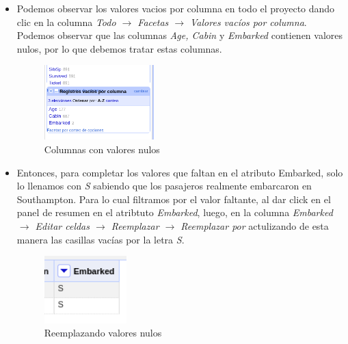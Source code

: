 \documentclass[12pt]{article}
\begin{document}
\begin{itemize}
                    \item Podemos observar los valores vacios por columna en todo el proyecto dando clic en la columna \textit{Todo $\rightarrow$ Facetas $\rightarrow$ Valores vacíos por columna}. Podemos observar que las columnas \textit{Age, Cabin} y \textit{Embarked} contienen valores nulos, por lo que debemos tratar estas columnas.
                        \newpage
                        \begin{figure}[!h]
                            \centering
                            \includegraphics[width=0.4\textwidth]{img/openrefine-13.png}
                            \caption{Columnas con valores nulos}
                        \end{figure}
                    
                    \item Entonces, para completar los valores que faltan en el atributo Embarked, solo lo llenamos con \textit{S} sabiendo que los pasajeros realmente embarcaron en Southampton. Para lo cual filtramos por el valor faltante, al dar click en el panel de resumen en el atribtuto \textit{Embarked}, luego, en la columna \textit{Embarked $\rightarrow$ Editar celdas $\rightarrow$ Reemplazar $\rightarrow$ Reemplazar por} actulizando de esta manera las casillas vacías por la letra \textit{S}.
                        \begin{figure}[!h]
                            \centering
                            \includegraphics[width=0.3\textwidth]{img/openrefine-14.png}
                            \caption{Reemplazando valores nulos}
                        \end{figure}
                    

\end{itemize}
\end{document}
